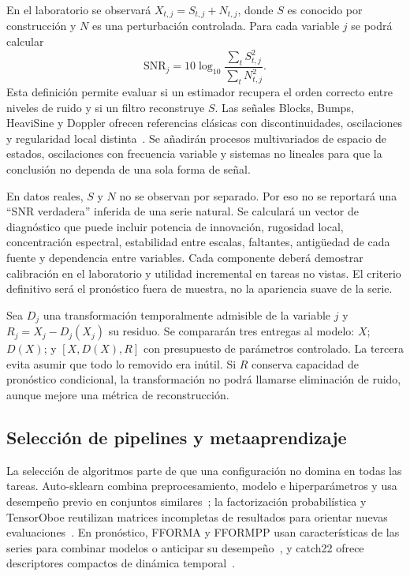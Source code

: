 \documentclass[11pt,letterpaper]{article}
\begin{document}
En el laboratorio se observará $X_{t,j}=S_{t,j}+N_{t,j}$, donde $S$ es conocido por construcción y $N$ es una perturbación controlada.
Para cada variable $j$ se podrá calcular
\begin{equation}
  \mathrm{SNR}_j=10\log_{10}\frac{\sum_t S_{t,j}^{2}}{\sum_t N_{t,j}^{2}}.
\end{equation}
Esta definición permite evaluar si un estimador recupera el orden correcto entre niveles de ruido y si un filtro reconstruye $S$.
Las señales Blocks, Bumps, HeaviSine y Doppler ofrecen referencias clásicas con discontinuidades, oscilaciones y regularidad local distinta~\cite{donoho1994ideal,donoho1995denoising}.
Se añadirán procesos multivariados de espacio de estados, oscilaciones con frecuencia variable y sistemas no lineales para que la conclusión no dependa de una sola forma de señal.

En datos reales, $S$ y $N$ no se observan por separado.
Por eso no se reportará una ``SNR verdadera'' inferida de una serie natural.
Se calculará un vector de diagnóstico que puede incluir potencia de innovación, rugosidad local, concentración espectral, estabilidad entre escalas, faltantes, antigüedad de cada fuente y dependencia entre variables.
Cada componente deberá demostrar calibración en el laboratorio y utilidad incremental en tareas no vistas.
El criterio definitivo será el pronóstico fuera de muestra, no la apariencia suave de la serie.

Sea $D_j$ una transformación temporalmente admisible de la variable $j$ y $R_j=X_j-D_j(X_j)$ su residuo.
Se compararán tres entregas al modelo: $X$; $D(X)$; y $[X,D(X),R]$ con presupuesto de parámetros controlado.
La tercera evita asumir que todo lo removido era inútil.
Si $R$ conserva capacidad de pronóstico condicional, la transformación no podrá llamarse eliminación de ruido, aunque mejore una métrica de reconstrucción.

\subsection{Selección de pipelines y metaaprendizaje}

La selección de algoritmos parte de que una configuración no domina en todas las tareas.
Auto-sklearn combina preprocesamiento, modelo e hiperparámetros y usa desempeño previo en conjuntos similares~\cite{feurer2015autosklearn}; la factorización probabilística y TensorOboe reutilizan matrices incompletas de resultados para orientar nuevas evaluaciones~\cite{fusi2018pmf,yang2020tensoroboe}.
En pronóstico, FFORMA y FFORMPP usan características de las series para combinar modelos o anticipar su desempeño~\cite{montero2020fforma,talagala2022fformpp}, y catch22 ofrece descriptores compactos de dinámica temporal~\cite{lubba2019catch22}.
\end{document}
